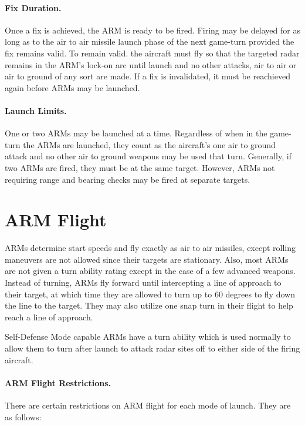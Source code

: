 
\paragraph{Fix Duration.} Once a fix is achieved, the ARM is ready to be fired. Firing may be delayed for as long as to the air to air missile launch phase of the next game-turn provided the fix remains valid. To remain valid. the aircraft must fly so that the targeted radar remains in the ARM's lock-on arc until launch and no other attacks, air to air or air to ground of any sort are made. If a fix is invalidated, it must be reachieved again before ARMs may be launched.

\paragraph{Launch Limits.} One or two ARMs may be launched at a time.  Regardless of when in the game-turn the ARMs are launched, they count as the aircraft's one air to ground attack and no other air to ground weapons may be used that turn. Generally, if two ARMs are fired, they must be at the same target. However, ARMs not requiring range and bearing checks may be fired at separate targets.

\section{ARM Flight}

ARMs determine start speeds and fly exactly as air to air missiles, except rolling maneuvers are not allowed since their targets are stationary. Also, most ARMs are not given a turn ability rating except in the case of a few advanced weapons. Instead of turning, ARMs fly forward until intercepting a line of approach to their target, at which time they are allowed to turn up to 60 degrees to fly down the line to the target. They may also utilize one snap turn in their flight to help reach a line of approach.

Self-Defense Mode capable ARMs have a turn ability which is used normally to allow them to turn after launch to attack radar sites off to either side of the firing aircraft.

\paragraph{ARM Flight Restrictions.} There are certain restrictions on ARM flight for each mode of launch. They are as follows:

